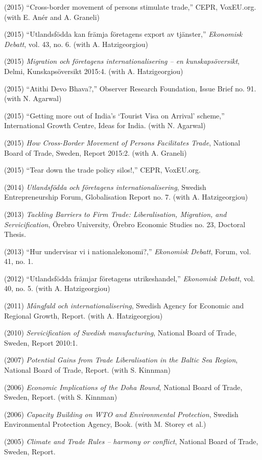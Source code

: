 \documentclass[11pt,a4paper]{article}
\newcommand{\publication}[1]{\item #1}
\begin{document}
\begin{enumerate}[label={[\arabic*]}]
\publication{(2015) ``Cross-border movement of persons stimulate trade,'' CEPR, VoxEU.org. (with E. Anér and A. Graneli)}

\publication{(2015) ``Utlandsfödda kan främja företagens export av tjänster,'' \textit{Ekonomisk Debatt}, vol. 43, no. 6. (with A. Hatzigeorgiou)}

\publication{(2015) \textit{Migration och företagens internationalisering -- en kunskapsöversikt}, Delmi, Kunskapsöversikt 2015:4. (with A. Hatzigeorgiou)}

\publication{(2015) ``Atithi Devo Bhava?,'' Observer Research Foundation, Issue Brief no. 91. (with N. Agarwal)}

\publication{(2015) ``Getting more out of India's `Tourist Visa on Arrival' scheme,'' International Growth Centre, Ideas for India. (with N. Agarwal)}

\publication{(2015) \textit{How Cross-Border Movement of Persons Facilitates Trade}, National Board of Trade, Sweden, Report 2015:2. (with A. Graneli)}

\publication{(2015) ``Tear down the trade policy silos!,'' CEPR, VoxEU.org.}

\publication{(2014) \textit{Utlandsfödda och företagens internationalisering}, Swedish Entrepreneurship Forum, Globalisation Report no. 7. (with A. Hatzigeorgiou)}

\publication{(2013) \textit{Tackling Barriers to Firm Trade: Liberalisation, Migration, and Servicification}, Örebro University, Örebro Economic Studies no. 23, Doctoral Thesis.}

\publication{(2013) ``Hur undervisar vi i nationalekonomi?,'' \textit{Ekonomisk Debatt}, Forum, vol. 41, no. 1.}

\publication{(2012) ``Utlandsfödda främjar företagens utrikeshandel,'' \textit{Ekonomisk Debatt}, vol. 40, no. 5. (with A. Hatzigeorgiou)}

\publication{(2011) \textit{Mångfald och internationalisering}, Swedish Agency for Economic and Regional Growth, Report. (with A. Hatzigeorgiou)}

\publication{(2010) \textit{Servicification of Swedish manufacturing}, National Board of Trade, Sweden, Report 2010:1.}

\publication{(2007) \textit{Potential Gains from Trade Liberalisation in the Baltic Sea Region}, National Board of Trade, Report. (with S. Kinnman)}

\publication{(2006) \textit{Economic Implications of the Doha Round}, National Board of Trade, Sweden, Report. (with S. Kinnman)}

\publication{(2006) \textit{Capacity Building on WTO and Environmental Protection}, Swedish Environmental Protection Agency, Book. (with M. Storey et al.)}

\publication{(2005) \textit{Climate and Trade Rules -- harmony or conflict}, National Board of Trade, Sweden, Report.}

\end{enumerate}
\end{document}
